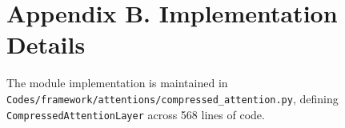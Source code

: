 \section*{Appendix B. Implementation Details}
The module implementation is maintained in \texttt{Codes/framework/attentions/compressed\_attention.py}, defining \texttt{CompressedAttentionLayer} across 568 lines of code.
